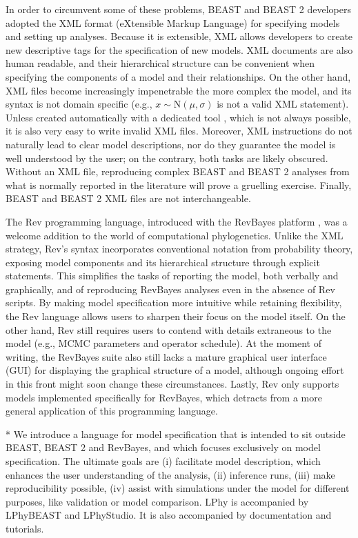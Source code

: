 \documentclass[10pt,letterpaper,table]{article}
\begin{document}
In order to circumvent some of these problems, BEAST \cite{beast} and
BEAST 2 \cite{beast2} developers adopted the XML format (eXtensible
Markup Language) for specifying models and setting up analyses.
Because it is extensible, XML allows developers to create new
descriptive tags for the specification of new models.
XML documents are also human readable, and their hierarchical
structure can be convenient when specifying the components of a model
and their relationships.
On the other hand, XML files become increasingly impenetrable the more
complex the model, and its syntax is not domain specific (e.g., $x
\sim \text{N}(\mu, \sigma)$ is not a valid XML statement).
Unless created automatically with a dedicated tool \cite{beauti},
which is not always possible, it is also very easy to write 
invalid XML files.
Moreover, XML instructions do not naturally lead to clear model
descriptions, nor do they guarantee the model is well understood by
the user;
on the contrary, both tasks are likely obscured.
Without an XML file, reproducing complex BEAST and BEAST 2 analyses
from what is normally reported in the literature will prove a
gruelling exercise.
Finally, BEAST and BEAST 2 XML files are not interchangeable. 

The Rev programming language, introduced with the RevBayes platform
\cite{revbayes}, was a welcome addition to the world of computational
phylogenetics. 
Unlike the XML strategy, Rev's syntax incorporates conventional
notation from probability theory, exposing model
components and its hierarchical structure through explicit statements.
This simplifies the tasks of reporting the model, both verbally and
graphically, and of reproducing RevBayes analyses even in the absence
of Rev scripts.
By making model specification more intuitive while retaining
flexibility, the Rev language allows users to sharpen their focus on
the model itself.
On the other hand, Rev still requires users to contend with
details extraneous to the model (e.g., MCMC parameters and operator
schedule).
At the moment of writing, the RevBayes suite also still lacks a mature
graphical user interface (GUI) for displaying the graphical structure
of a model, although ongoing effort in this front might soon change
these circumstances.
Lastly, Rev only supports models implemented specifically for
RevBayes, which detracts from a more general application of this
programming language.

* We introduce a language for model specification that is intended to
sit outside BEAST, BEAST 2 and RevBayes, and which focuses exclusively
on model specification.
The ultimate goals are (i) facilitate model description, which enhances
the user understanding of the analysis, (ii) inference runs, (iii)
make reproducibility possible, (iv) assist with simulations under the
model for different purposes, like validation or model comparison.
LPhy is accompanied by LPhyBEAST and LPhyStudio.
It is also accompanied by documentation and tutorials.
\end{document}
